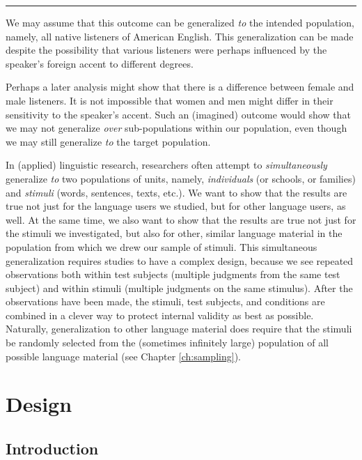 \documentclass[
]{book}
\begin{document}
\begin{center}\rule{0.5\linewidth}{0.5pt}\end{center}

We may assume that this outcome can be generalized \emph{to} the intended population, namely, all native listeners of American English. This generalization can be made despite the possibility that various listeners were perhaps influenced by the speaker's foreign accent to different degrees.

Perhaps a later analysis might show that there is a difference between female and male listeners. It is not impossible that women and men might differ in their sensitivity to the speaker's accent. Such an (imagined) outcome would show that we may not generalize \emph{over} sub-populations within our population, even though we may still generalize \emph{to} the target population.

In (applied) linguistic research, researchers often attempt to \emph{simultaneously} generalize \emph{to} two populations of units, namely, \emph{individuals} (or schools, or families) and \emph{stimuli} (words, sentences, texts, etc.). We want to show that the results are true not just for the language users we studied, but for other language users, as well. At the same time, we also want to show that the results are true not just for the stimuli we investigated, but also for other, similar language material in the population from which we drew our sample of stimuli. This simultaneous generalization requires studies to have a complex design, because we see repeated observations both within test subjects (multiple judgments from the same test subject) and within stimuli (multiple judgments on the same stimulus). After the observations have been made, the stimuli, test subjects, and conditions are combined in a clever way to protect internal validity as best as possible. Naturally, generalization to other language material does require that the stimuli be randomly selected from the (sometimes infinitely large) population of all possible language material (see Chapter \ref{ch:sampling}).

\hypertarget{ch:design}{%
\chapter{Design}\label{ch:design}}

\hypertarget{sec:design-introduction}{%
\section{Introduction}\label{sec:design-introduction}}
\end{document}
